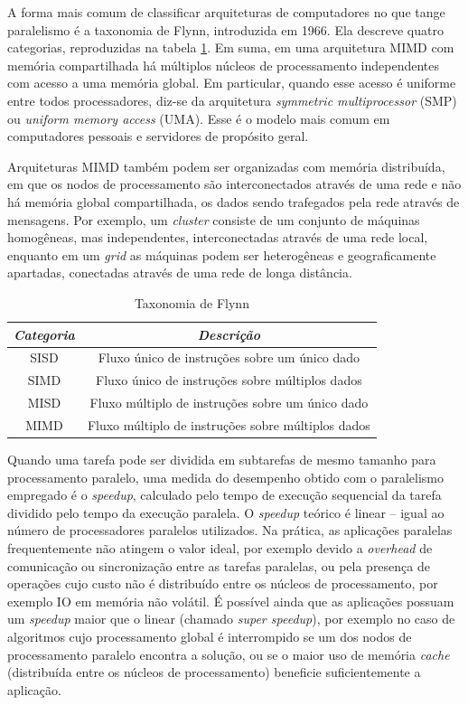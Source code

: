 \documentclass[cic,tc]{iiufrgs}
\begin{document}
A forma mais comum de classificar arquiteturas de computadores no que tange
paralelismo é a taxonomia de Flynn, introduzida em 1966. Ela descreve quatro
categorias, reproduzidas na tabela \ref{tbl:flynn}. Em suma, em uma arquitetura
MIMD com memória compartilhada há múltiplos núcleos de processamento
independentes com acesso a uma memória global. Em particular, quando esse
acesso é uniforme entre todos processadores, diz-se da arquitetura
\textit{symmetric multiprocessor} (SMP) ou \textit{uniform memory access}
(UMA). Esse é o modelo mais comum em computadores pessoais e servidores de
propósito geral.

Arquiteturas MIMD também podem ser organizadas com memória distribuída, em que
os nodos de processamento são interconectados através de uma rede e não há
memória global compartilhada, os dados sendo trafegados pela rede através de
mensagens. Por exemplo, um \textit{cluster} consiste de um conjunto de máquinas
homogêneas, mas independentes, interconectadas através de uma rede local,
enquanto em um \textit{grid} as máquinas podem ser heterogêneas e
geograficamente apartadas, conectadas através de uma rede de longa distância.

\begin{table}[h]
    \caption{Taxonomia de Flynn}
    \centering
        \begin{tabular}{c|c}
          \hline
          \textit{Categoria}  &   \textit{Descrição} \\
          \hline
          \hline
          SISD & Fluxo único de instruções sobre um único dado \\
          SIMD & Fluxo único de instruções sobre múltiplos dados \\
          MISD & Fluxo múltiplo de instruções sobre um único dado \\
          MIMD & Fluxo múltiplo de instruções sobre múltiplos dados \\
          \hline
        \end{tabular}
    \label{tbl:flynn}
\end{table}

Quando uma tarefa pode ser dividida em subtarefas de mesmo tamanho para
processamento paralelo, uma medida do desempenho obtido com o paralelismo
empregado é o \textit{speedup}, calculado pelo tempo de execução sequencial da
tarefa dividido pelo tempo da execução paralela. O \textit{speedup} teórico é
linear -- igual ao número de processadores paralelos utilizados. Na prática, as
aplicações paralelas frequentemente não atingem o valor ideal, por exemplo
devido a \textit{overhead} de comunicação ou sincronização entre as tarefas
paralelas, ou pela presença de operações cujo custo não é distribuído entre os
núcleos de processamento, por exemplo IO em memória não volátil. É possível
ainda que as aplicações possuam um \textit{speedup} maior que o linear (chamado
\textit{super speedup}), por exemplo no caso de algoritmos cujo processamento
global é interrompido se um dos nodos de processamento paralelo encontra a
solução, ou se o maior uso de memória \textit{cache} (distribuída entre os
núcleos de processamento) beneficie suficientemente a aplicação.
\end{document}
